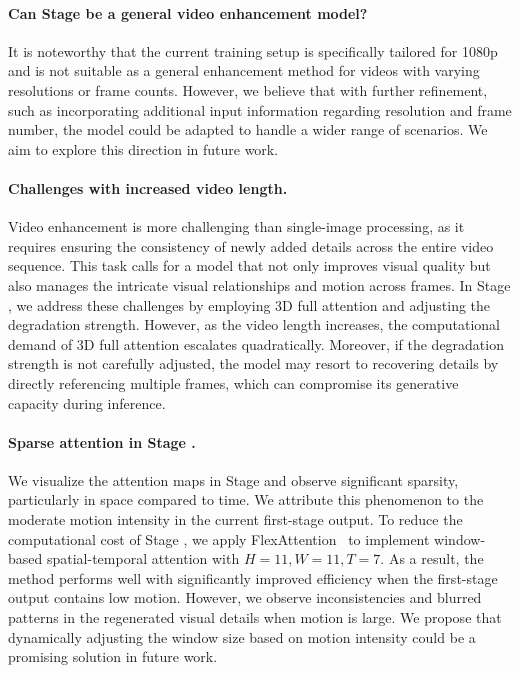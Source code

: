 \paragraph{Can Stage  be a general video enhancement model?} It is noteworthy that the current training setup is specifically tailored for 1080p  and is not suitable as a general enhancement method for videos with varying resolutions or frame counts. However, we believe that with further refinement, such as incorporating additional input information regarding resolution and frame number, the model could be adapted to handle a wider range of scenarios. We aim to explore this direction in future work.
\paragraph{Challenges with increased video length.} Video enhancement is more challenging than single-image processing, as it requires ensuring the consistency of newly added details across the entire video sequence. This task calls for a model that not only improves visual quality but also manages the intricate visual relationships and motion across frames. In Stage , we address these challenges by employing 3D full attention and adjusting the degradation strength. However, as the video length increases, the computational demand of 3D full attention escalates quadratically. Moreover, if the degradation strength is not carefully adjusted, the model may resort to recovering details by directly referencing multiple frames, which can compromise its generative capacity during inference.
\paragraph{Sparse attention in Stage .} We visualize the attention maps in Stage  and observe significant sparsity, particularly in space compared to time. We attribute this phenomenon to the moderate motion intensity in the current first-stage output. To reduce the computational cost of Stage , we apply FlexAttention~\citep{flexattention} to implement window-based spatial-temporal attention with $H=11, W=11, T=7$. As a result, the method performs well with significantly improved efficiency when the first-stage output contains low motion. However, we observe inconsistencies and blurred patterns in the regenerated visual details when motion is large. We propose that dynamically adjusting the window size based on motion intensity could be a promising solution in future work.




